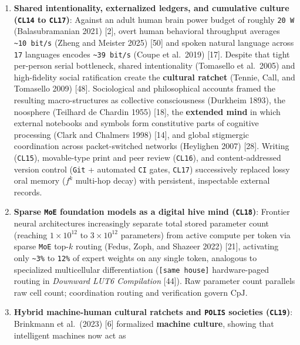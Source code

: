 \documentclass[10pt,letterpaper]{article}
\providecommand{\tightlist}{\setlength{\itemsep}{1pt}\setlength{\parskip}{0pt}}
\begin{document}
\begin{enumerate}
\def\labelenumi{\arabic{enumi}.}
\tightlist
\item
  \textbf{Shared intentionality, externalized ledgers, and cumulative
  culture (\texttt{CL14} to \texttt{CL17})}: Against an adult human
  brain power budget of roughly \texttt{20\ W} (Balasubramanian 2021)
  {[}2{]}, overt human behavioral throughput averages
  \texttt{\textasciitilde{}10\ bit/s} (Zheng and Meister 2025) {[}50{]}
  and spoken natural language across \texttt{17} languages encodes
  \texttt{\textasciitilde{}39\ bit/s} (Coupe et al.~2019) {[}17{]}.
  Despite that tight per-person serial bottleneck, shared intentionality
  (Tomasello et al.~2005) and high-fidelity social ratification create
  the \textbf{cultural ratchet} (Tennie, Call, and Tomasello 2009)
  {[}48{]}. Sociological and philosophical accounts framed the resulting
  macro-structures as collective consciousness (Durkheim 1893), the
  noosphere (Teilhard de Chardin 1955) {[}18{]}, the \textbf{extended
  mind} in which external notebooks and symbols form constitutive parts
  of cognitive processing (Clark and Chalmers 1998) {[}14{]}, and global
  stigmergic coordination across packet-switched networks (Heylighen
  2007) {[}28{]}. Writing (\texttt{CL15}), movable-type print and peer
  review (\texttt{CL16}), and content-addressed version control
  (\texttt{Git} + automated \texttt{CI} gates, \texttt{CL17})
  successively replaced lossy oral memory (\(f^k\) multi-hop decay) with
  persistent, inspectable external records.
\item
  \textbf{Sparse \texttt{MoE} foundation models as a digital hive mind
  (\texttt{CL18})}: Frontier neural architectures increasingly separate
  total stored parameter count (reaching \(1 \times 10^{12}\) to
  \(3 \times 10^{12}\) parameters) from active compute per token via
  sparse \texttt{MoE} top-\(k\) routing (Fedus, Zoph, and Shazeer 2022)
  {[}21{]}, activating only \texttt{\textasciitilde{}3\%} to
  \texttt{12\%} of expert weights on any single token, analogous to
  specialized multicellular differentiation (\texttt{{[}same\ house{]}}
  hardware-paged routing in \emph{Downward LUT6 Compilation} {[}44{]}).
  Raw parameter count parallels raw cell count; coordination routing and
  verification govern \(\mathrm{CpJ}\).
\item
  \textbf{Hybrid machine-human cultural ratchets and \texttt{POLIS}
  societies (\texttt{CL19})}: Brinkmann et al.~(2023) {[}6{]} formalized
  \textbf{machine culture}, showing that intelligent machines now act as

\end{enumerate}
\end{document}
